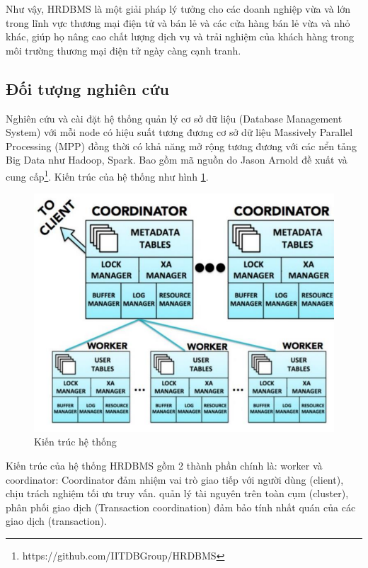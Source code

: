 \documentclass{article}[14pt]
\begin{document}
{Như vậy, HRDBMS là một giải pháp lý tưởng cho các doanh nghiệp vừa và lớn trong lĩnh vực thương mại điện tử và bán lẻ và các cửa hàng bán lẻ vừa và nhỏ khác, giúp họ nâng cao chất lượng dịch vụ và trải nghiệm của khách hàng trong môi trường thương mại điện tử ngày càng cạnh tranh.

\subsection{Đối tượng nghiên cứu }

Nghiên cứu và cài đặt hệ thống quản lý cơ sở dữ liệu (Database Management System) với mỗi node có hiệu suất tương đương cơ sở dữ liệu Massively Parallel Processing (MPP) đồng thời có khả năng mở rộng tương đương với các nển tảng Big Data như Hadoop, Spark. Bao gồm mã nguồn do Jason Arnold đề xuất và cung cấp\footnote{https://github.com/IITDBGroup/HRDBMS}.
Kiến trúc của hệ thống như hình \ref{fig:Component}.

\begin{figure}[htbp]
\centerline{\includegraphics[scale=.7]{images/Component.png}}
\captionsetup{font=Large}
\caption{Kiến trúc hệ thống \cite{arnold2019hrdbms}}
\label{fig:Component}
\end{figure}

Kiến trúc của hệ thống HRDBMS gồm 2 thành phần chính là: worker và coordinator:
Coordinator đảm nhiệm vai trò giao tiếp với người dùng (client), chịu trách nghiệm tối ưu truy vấn. quản lý tài nguyên trên toàn cụm (cluster), phân phối giao dịch (Transaction coordination) đảm bảo tính nhất quán của các giao dịch (transaction).

}
\end{document}

